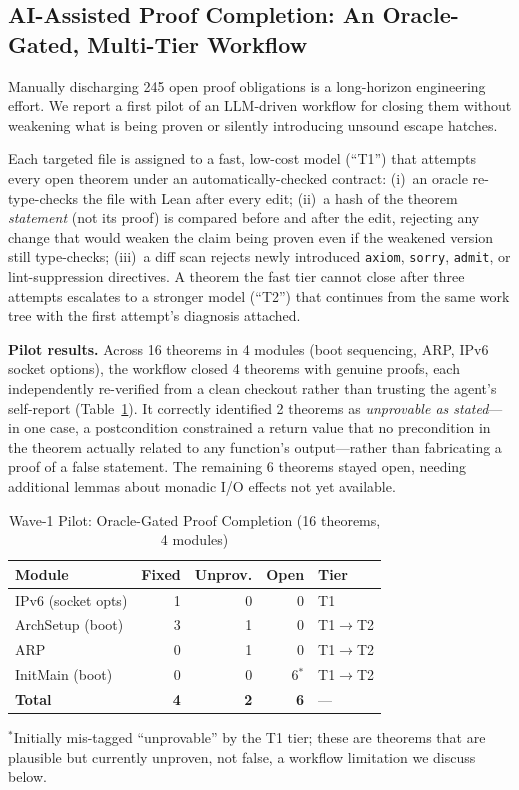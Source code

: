 \documentclass[sigconf,nonacm=false]{acmart}
\begin{document}
\subsection{AI-Assisted Proof Completion: An Oracle-Gated, Multi-Tier Workflow}
\label{sec:ai-proof}
Manually discharging 245 open proof obligations is a long-horizon engineering effort. We report a first pilot of an LLM-driven workflow for closing them without weakening what is being proven or silently introducing unsound escape hatches.

Each targeted file is assigned to a fast, low-cost model (``T1'') that attempts every open theorem under an automatically-checked contract: (i)~an oracle re-type-checks the file with Lean after every edit; (ii)~a hash of the theorem \emph{statement} (not its proof) is compared before and after the edit, rejecting any change that would weaken the claim being proven even if the weakened version still type-checks; (iii)~a diff scan rejects newly introduced \texttt{axiom}, \texttt{sorry}, \texttt{admit}, or lint-suppression directives. A theorem the fast tier cannot close after three attempts escalates to a stronger model (``T2'') that continues from the same work tree with the first attempt's diagnosis attached.

\textbf{Pilot results.} Across 16 theorems in 4 modules (boot sequencing, ARP, IPv6 socket options), the workflow closed 4 theorems with genuine proofs, each independently re-verified from a clean checkout rather than trusting the agent's self-report (Table~\ref{tab:pilot}). It correctly identified 2 theorems as \emph{unprovable as stated}---in one case, a postcondition constrained a return value that no precondition in the theorem actually related to any function's output---rather than fabricating a proof of a false statement. The remaining 6 theorems stayed open, needing additional lemmas about monadic I/O effects not yet available.

\begin{table}[t]
\caption{Wave-1 Pilot: Oracle-Gated Proof Completion (16 theorems, 4 modules)}
\label{tab:pilot}
\small
\begin{tabular}{lrrrl}
\toprule
\textbf{Module} & \textbf{Fixed} & \textbf{Unprov.} & \textbf{Open} & \textbf{Tier} \\
\midrule
IPv6 (socket opts) & 1 & 0 & 0 & T1 \\
ArchSetup (boot)   & 3 & 1 & 0 & T1$\to$T2 \\
ARP                & 0 & 1 & 0 & T1$\to$T2 \\
InitMain (boot)    & 0 & 0 & 6$^{*}$ & T1$\to$T2 \\
\midrule
\textbf{Total}     & \textbf{4} & \textbf{2} & \textbf{6} & --- \\
\bottomrule
\end{tabular}

\smallskip
\footnotesize $^{*}$Initially mis-tagged ``unprovable'' by the T1 tier; these are theorems that are plausible but currently unproven, not false, a workflow limitation we discuss below.
\end{table}
\end{document}
